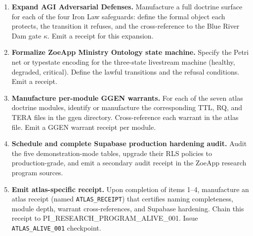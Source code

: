 \begin{enumerate}
  \item \textbf{Expand AGI Adversarial Defenses.} Manufacture a full doctrine
        surface for each of the four Iron Law safeguards: define the formal
        object each protects, the transition it refuses, and the cross-reference
        to the Blue River Dam gate $\kappa$. Emit a receipt for this expansion.

  \item \textbf{Formalize ZoeApp Ministry Ontology state machine.} Specify the
        Petri net or typestate encoding for the three-state livestream machine
        (healthy, degraded, critical). Define the lawful transitions and the
        refusal conditions. Emit a receipt.

  \item \textbf{Manufacture per-module GGEN warrants.} For each of the seven
        atlas doctrine modules, identify or manufacture the corresponding TTL,
        RQ, and TERA files in the ggen directory. Cross-reference each warrant
        in the atlas file. Emit a GGEN warrant receipt per module.

  \item \textbf{Schedule and complete Supabase production hardening audit.}
        Audit the five demonstration-mode tables, upgrade their RLS policies to
        production-grade, and emit a secondary audit receipt in the ZoeApp
        research program sources.

  \item \textbf{Emit atlas-specific receipt.} Upon completion of items 1--4,
        manufacture an atlas receipt (named \texttt{ATLAS\_RECEIPT}) that
        certifies naming completeness, module depth, warrant cross-references,
        and Supabase hardening. Chain this receipt to
        PI\_RESEARCH\_PROGRAM\_ALIVE\_001. Issue \texttt{ATLAS\_ALIVE\_001}
        checkpoint.
\end{enumerate}
